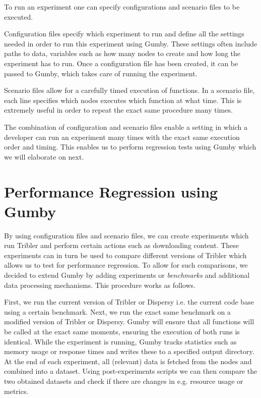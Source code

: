 To run an experiment one can specify configurations and scenario files to be executed.

Configuration files specify which experiment to run and define all the settings needed in order to run this experiment using Gumby.
These settings often include paths to data, variables such as how many nodes to create and how long the experiment has to run.
Once a configuration file has been created, it can be passed to Gumby, which takes care of running the experiment.

Scenario files allow for a carefully timed execution of functions.
In a scenario file, each line specifies which nodes executes which function at what time.
This is extremely useful in order to repeat the exact same procedure many times.

The combination of configuration and scenario files enable a setting in which a developer can run an experiment many times with the exact same execution order and timing.
This enables us to perform regression tests using Gumby which we will elaborate on next.

\section{Performance Regression using Gumby}

By using configuration files and scenario files, we can create experiments which run Tribler and perform certain actions such as downloading content.
These experiments can in turn be used to compare different versions of Tribler which allows us to test for performance regression. 
To allow for such comparisons, we decided to extend Gumby by adding experiments or \emph{benchmarks} and additional data processing mechanisms.
This procedure works as follows.

First, we run the current version of Tribler or Dispersy i.e. the current code base using a certain benchmark.
Next, we run the exact same benchmark on a modified version of Tribler or Dispersy.
Gumby will ensure that all functions will be called at the exact same moments, ensuring the execution of both runs is identical.
While the experiment is running, Gumby tracks statistics such as memory usage or response times and writes these to a specified output directory.
At the end of each experiment, all (relevant) data is fetched from the nodes and combined into a dataset.
Using post-experiments scripts we can then compare the two obtained datasets and check if there are changes in e.g. resource usage or metrics.

